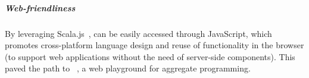 \subparagraph*{Web-friendliness}
%
By leveraging Scala.js~\cite{DBLP:conf/scala/Doeraene18}, \scafi{} can be easily 
 accessed through JavaScript,
 which promotes cross-platform language design 
 and reuse of functionality in the browser
 (to support web applications without the need of server-side components).
%
This paved the path 
 to \scafiweb{}~\cite{DBLP:conf/coordination/AguzziCMPV21},
 a web playground for aggregate programming.
%